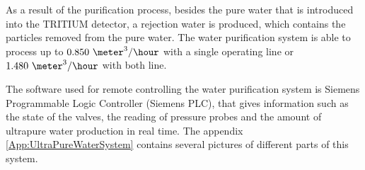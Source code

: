 As a result of the purification process, besides the pure water that is introduced into the TRITIUM detector, a rejection water is produced,  which contains the particles removed from the pure water. The water purification system is able to process up to $0.850~\meter^3/\hour$ with a single operating line or $1.480~\meter^3/\hour$ with both line.

The software used for remote controlling the water purification system is Siemens Programmable Logic Controller (Siemens PLC), that gives information such as the state of the valves, the reading of pressure probes and the amount of ultrapure water production in real time. The appendix \ref{App:UltraPureWaterSystem} contains several pictures of different parts of this system.